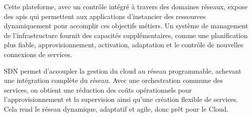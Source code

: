 Cette plateforme, avec un contrôle intégré à travers des domaines réseaux, expose des \glspl{api} qui permettent aux applications d'instancier des ressources dynamiquement pour accomplir ces objectifs métiers. Un  système de management de l'infrastructure fournit des capacités supplémentaires, comme une planification plus fiable, approvisionnement, activation, adaptation et le contrôle de nouvelles connexions de services.

SDN permet d'accoupler la gestion du cloud au réseau programmable, achevant une intégration complète du réseau. Avec une orchestration commune des services, on obtient une réduction des coûts opérationnels pour l'approvisionnement et la supervision ainsi qu'une création flexible de services. Cela rend le réseau dynamique, adaptatif et agile, donc prêt pour le Cloud.

